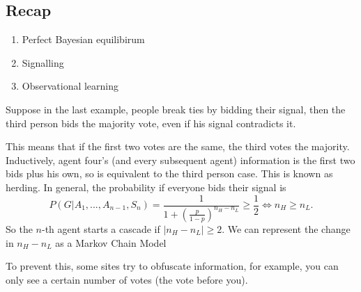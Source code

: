 \newsection
\subsection*{Recap}
\begin{enumerate}
    \item Perfect Bayesian equilibirum
    \item Signalling
    \item Observational learning
\end{enumerate}

Suppose in the last example, people break ties by bidding their signal, then the third person bids the majority vote, even if his signal contradicts it. 

This means that if the first two votes are the same, the third votes the majority. Inductively, agent four's (and every subsequent agent) information is the first two bids plus his own, so is equivalent to the third person case. This is known as herding.
In general, the probability if everyone bids their signal is \[
P(G| A_1,...,A_{n-1},S_n) = \frac{1}{1+\left(\frac{p}{1-p}\right)^{n_H-n_L}} \geq \frac{1}{2} \iff n_H\geq n_L.
\]
So the $n$-th agent starts a cascade if $|n_H-n_L|\geq2$.
We can represent the change in $n_H-n_L$ as a Markov Chain Model
    \begin{center}
    \end{center}

To prevent this, some sites try to obfuscate information, for example, you can only see a certain number of votes (the vote before you).

